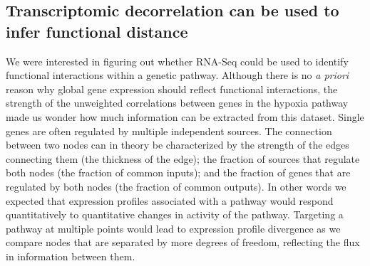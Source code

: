 \documentclass[9pt,twocolumn,twoside]{pnas-new}
\begin{document}
\subsection*{Transcriptomic decorrelation can be used to infer functional distance}
\label{sub:decorrelation}

We were interested in figuring out whether RNA-Seq could be used to identify
functional interactions within a genetic pathway. Although there is no \emph{a
priori} reason why global gene expression should reflect functional interactions,
the strength of the unweighted correlations between genes in the hypoxia pathway
made us wonder how much information can be extracted from this dataset. Single
genes are often regulated by multiple independent sources. The connection between
two nodes can in theory be characterized by the strength of the edges connecting
them (the thickness of the edge); the fraction of sources that regulate both
nodes (the fraction of common inputs); and the fraction of genes that are
regulated by both nodes (the fraction of common outputs).
In other words we expected that expression profiles associated with a pathway
would respond quantitatively to quantitative changes in activity of the pathway.
Targeting a pathway at multiple points would lead to expression profile
divergence as we compare nodes that are separated by more degrees of freedom,
reflecting the flux in information between them.
\end{document}
